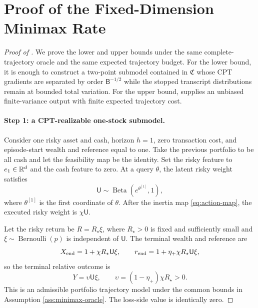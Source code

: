 \section{Proof of the Fixed-Dimension Minimax Rate}\label{app:minimax}

\begin{proof}[Proof of ]
We prove the lower and upper bounds under the same complete-trajectory oracle and the same expected trajectory budget.  For the lower bound, it is enough to construct a two-point submodel contained in $\mathfrak C$ whose CPT gradients are separated by order $\mathsf B^{-1/2}$ while the stopped transcript distributions remain at bounded total variation.  For the upper bound,  supplies an unbiased finite-variance output with finite expected trajectory cost.

\paragraph{Step 1: a CPT-realizable one-stock submodel.}
Consider one risky asset and cash, horizon $h=1$, zero transaction cost, and episode-start wealth and reference equal to one.  Take the previous portfolio to be all cash and let the feasibility map be the identity.  Set the risky feature to $e_1\in\mathbb R^d$ and the cash feature to zero.  At a query $\theta$, the latent risky weight satisfies
\[
 \mathsf U\sim\operatorname{Beta}(e^{\theta^{[1]}},1),
\]
where $\theta^{[1]}$ is the first coordinate of $\theta$.  After the inertia map \eqref{eq:action-map}, the executed risky weight is $\chi\mathsf U$.

Let the risky return be $R=R_\star\xi$, where $R_\star>0$ is fixed and sufficiently small and
$\xi\sim\operatorname{Bernoulli}(p)$ is independent of $\mathsf U$.  The terminal wealth and reference are
\[
 X_{\rm end}=1+\chi R_\star\mathsf U\xi,
 \qquad
 r_{\rm end}=1+\eta_+\chi R_\star\mathsf U\xi,
\]
so the terminal relative outcome is
\begin{equation}\label{eq:minimax-relative-outcome}
 Y=\upsilon\mathsf U\xi,
 \qquad
 \upsilon=(1-\eta_+)\chi R_\star>0.
\end{equation}
This is an admissible portfolio trajectory model under the common bounds in Assumption \ref{ass:minimax-oracle}.  The loss-side value is identically zero.


\end{proof}
